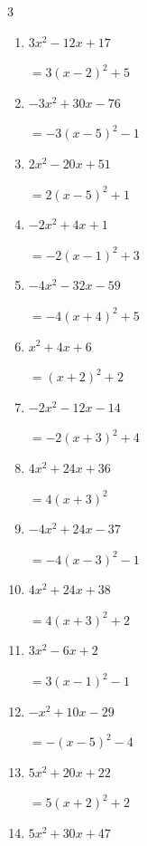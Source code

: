 \begin{multicols}{3}
\begin{enumerate}
  \item $3x^{2}-12x+17$

        $=3\left( x-2\right)^{2}+5$

  \item $-3x^{2}+30x-76$

        $=-3\left( x-5\right)^{2}-1$

\columnbreak %

\resetques

  \item $2x^{2}-20x+51$

        $=2\left( x-5\right)^{2}+1$

  \item $-2x^{2}+4x+1$

        $=-2\left( x-1\right)^{2}+3$

  \item $-4x^{2}-32x-59$

        $=-4\left( x+4\right)^{2}+5$

  \item $x^{2}+4x+6$

        $=\left( x+2\right)^{2}+2$

  \item $-2x^{2}-12x-14$

        $=-2\left( x+3\right)^{2}+4$

  \item $4x^{2}+24x+36$

        $=4\left( x+3\right)^{2}$

  \item $-4x^{2}+24x-37$

        $=-4\left( x-3\right)^{2}-1$

  \item $4x^{2}+24x+38$

        $=4\left( x+3\right)^{2}+2$

  \item $3x^{2}-6x+2$

        $=3\left( x-1\right)^{2}-1$

  \item $-x^{2}+10x-29$

        $=-\left( x-5\right)^{2}-4$

\columnbreak %

  \item $5x^{2}+20x+22$

        $=5\left( x+2\right)^{2}+2$

  \item $5x^{2}+30x+47$


\end{enumerate}
\end{multicols}
